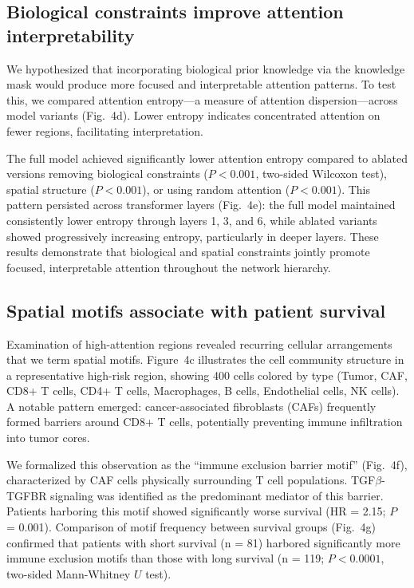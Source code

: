 \documentclass[pdflatex,sn-nature]{sn-jnl}%
\theoremstyle{thmstyleone}%
\theoremstyle{thmstyletwo}%
\theoremstyle{thmstylethree}%
\begin{document}
\subsection{Biological constraints improve attention interpretability}\label{subsec9}

We hypothesized that incorporating biological prior knowledge via the knowledge mask would produce more focused and interpretable attention patterns. To test this, we compared attention entropy---a measure of attention dispersion---across model variants (Fig.~4d). Lower entropy indicates concentrated attention on fewer regions, facilitating interpretation.

The full model achieved significantly lower attention entropy compared to ablated versions removing biological constraints ($P < 0.001$, two-sided Wilcoxon test), spatial structure ($P < 0.001$), or using random attention ($P < 0.001$). This pattern persisted across transformer layers (Fig.~4e): the full model maintained consistently lower entropy through layers 1, 3, and 6, while ablated variants showed progressively increasing entropy, particularly in deeper layers. These results demonstrate that biological and spatial constraints jointly promote focused, interpretable attention throughout the network hierarchy.

\subsection{Spatial motifs associate with patient survival}\label{subsec10}

Examination of high-attention regions revealed recurring cellular arrangements that we term spatial motifs. Figure~4c illustrates the cell community structure in a representative high-risk region, showing 400 cells colored by type (Tumor, CAF, CD8+ T cells, CD4+ T cells, Macrophages, B cells, Endothelial cells, NK cells). A notable pattern emerged: cancer-associated fibroblasts (CAFs) frequently formed barriers around CD8+ T cells, potentially preventing immune infiltration into tumor cores.

We formalized this observation as the ``immune exclusion barrier motif'' (Fig.~4f), characterized by CAF cells physically surrounding T cell populations\cite{bib56}. TGF$\beta$-TGFBR signaling was identified as the predominant mediator of this barrier\cite{bib56}. Patients harboring this motif showed significantly worse survival (HR = 2.15; $P$ = 0.001). Comparison of motif frequency between survival groups (Fig.~4g) confirmed that patients with short survival (n = 81) harbored significantly more immune exclusion motifs than those with long survival (n = 119; $P < 0.0001$, two-sided Mann-Whitney $U$ test).
\end{document}
